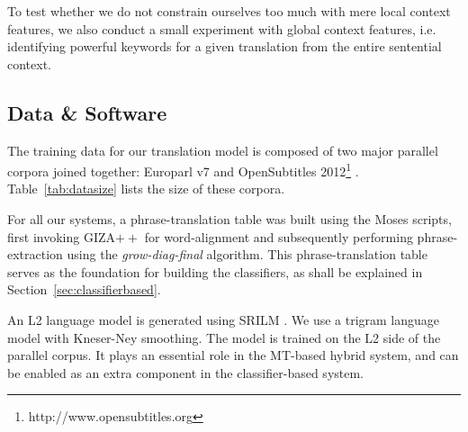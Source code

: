 To test whether we do not constrain ourselves too much with mere local context
features, we also conduct a small experiment with global context features, i.e.
identifying powerful keywords for a given translation from the entire
sentential context.


\subsection{Data \& Software}

The training data for our translation model is composed of two major
parallel corpora joined together: Europarl v7 \citep{EUROPARL} and
OpenSubtitles 2012\footnote{http://www.opensubtitles.org}
\citep{OPUS2012}.  Table~\ref{tab:datasize} lists the size of these
corpora.

\begin{table}[htb]
\caption{Corpora sizes for all of the language pairs}
\label{tab:datasize}
\noindent{}
\end{table}

For all our systems, a phrase-translation table was built using the Moses
scripts, first invoking GIZA$++$ for word-alignment and subsequently performing
phrase-extraction using the \emph{grow-diag-final} algorithm. This
phrase-translation table serves as the foundation for building the classifiers,
as shall be explained in Section~\ref{sec:classifierbased}.

An L2 language model is generated using SRILM \citep{SRILM}. We use a trigram
language model with Kneser-Ney smoothing. The model is trained on the L2 side
of the parallel corpus. It plays an essential role in the MT-based hybrid system,
and can be enabled as an extra component in the classifier-based system.

